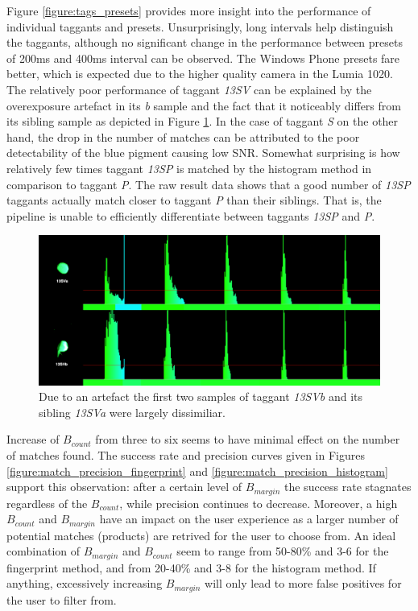 \documentclass[thesis.tex]{subfiles}
\begin{document}
Figure \ref{figure:tags_presets} provides more insight into the performance of individual taggants and presets. Unsurprisingly, long intervals help distinguish the taggants, although no significant change in the performance between presets of 200ms and 400ms interval can be observed. The Windows Phone presets fare better, which is expected due to the higher quality camera in the Lumia 1020. The relatively poor performance of taggant \emph{13SV} can be explained by the overexposure artefact in its \emph{b} sample and the fact that it noticeably differs from its sibling sample as depicted in Figure \ref{figure:13SV}. In the case of taggant \emph{S} on the other hand, the drop in the number of matches can be attributed to the poor detectability of the blue pigment causing low SNR. Somewhat surprising is how relatively few times taggant \emph{13SP} is matched by the histogram method in comparison to taggant \emph{P}. The raw result data shows that a good number of \emph{13SP} taggants actually match closer to taggant \emph{P} than their siblings. That is, the pipeline is unable to efficiently differentiate between taggants \emph{13SP} and \emph{P}.

\begin{figure}[h!]
  \centering \includegraphics[page=1,width=\textwidth]{images/findings/13SV}
  \caption{Due to an artefact the first two samples of taggant \emph{13SVb} and its sibling \emph{13SVa} were largely dissimiliar.}
  \label{figure:13SV}
\end{figure}

Increase of $B_{count}$ from three to six seems to have minimal effect on the number of matches found. The success rate and precision curves given in Figures \ref{figure:match_precision_fingerprint} and \ref{figure:match_precision_histogram} support this observation: after a certain level of $B_{margin}$ the success rate stagnates regardless of the $B_{count}$, while precision continues to decrease. Moreover, a high $B_{count}$ and $B_{margin}$ have an impact on the user experience as a larger number of potential matches (products) are retrived for the user to choose from. An ideal combination of $B_{margin}$ and $B_{count}$ seem to range from 50-80\% and 3-6 for the fingerprint method, and from 20-40\% and 3-8 for the histogram method. If anything, excessively increasing $B_{margin}$ will only lead to more false positives for the user to filter from.
\end{document}
